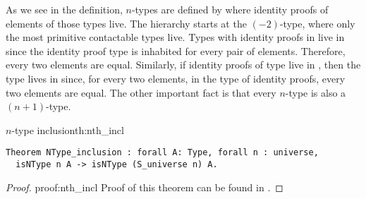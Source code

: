 As we see in the definition, $n$-types are defined by where identity proofs of elements of those types live. The hierarchy starts at the $(-2)$-type, where only the most primitive contactable types live. Types with identity proofs in  live in  since the identity proof type is inhabited for every pair of elements. Therefore, every two elements are equal. Similarly, if identity proofs of type live in , then the type lives in  since, for every two elements, in the type of identity proofs, every two elements are equal. The other important fact is that every $n$-type is also a $(n+1)$-type.
\begin{theo}{$n$-type inclusion}{th:nth_incl}
\begin{verbatim}
Theorem NType_inclusion : forall A: Type, forall n : universe,
  isNType n A -> isNType (S_universe n) A.
\end{verbatim}
\end{theo}
\begin{proof}{}{proof:nth_incl}
Proof of this theorem can be found in .
\end{proof}

